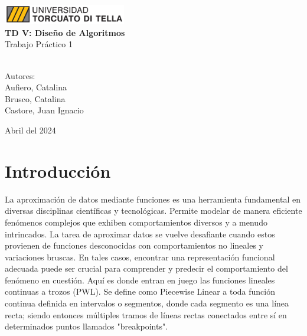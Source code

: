 \documentclass{article}
\begin{document}
    \begin{titlepage}
        \centering
        \vspace*{0.5cm}
        \vspace{1cm}
        \includegraphics[width=0.4\textwidth]{utdt-logo.jpg} \\
        \vspace{1cm}
        \Large{\bfseries{TD V: Diseño de Algoritmos}}\\
        \vspace{0.8cm}
        \Large{Trabajo Práctico 1}\\
        \vspace{0.5cm}
         \\
        \vspace{6cm}
        
        \Large{Autores:}\\
        \vspace{0.5cm}
        \Large{Aufiero, Catalina}\\
        \vspace{0.2cm}
        \Large{Brusco, Catalina}\\
        \vspace{0.2cm}
        \Large{Castore, Juan Ignacio}\\

        
        \vfill
        
        \large{Abril del 2024}
    \end{titlepage} 

\section{Introducción}
    \vspace{0.5cm}
    La aproximación de datos mediante funciones es una herramienta fundamental en diversas disciplinas científicas y tecnológicas. Permite modelar de manera eficiente fenómenos complejos que exhiben comportamientos diversos y a menudo intrincados. La tarea de aproximar datos se vuelve desafiante cuando estos provienen de funciones desconocidas con comportamientos no lineales y variaciones bruscas. En tales casos, encontrar una representación funcional adecuada puede ser crucial para comprender y predecir el comportamiento del fenómeno en cuestión. Aquí es donde entran en juego las funciones lineales continuas a trozos (PWL). Se define como Piecewise Linear a toda función continua definida en intervalos o segmentos, donde cada segmento es una línea recta; siendo entonces múltiples tramos de líneas rectas conectados entre sí en determinados puntos llamados "breakpoints".
\end{document}
